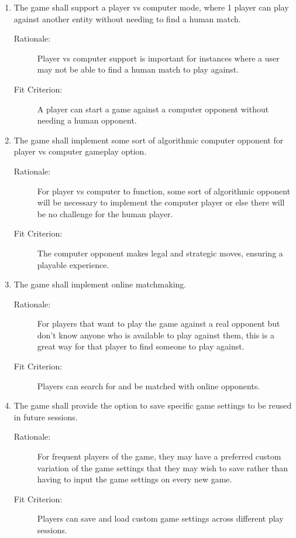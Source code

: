 \begin{enumerate}[label=R\arabic*, start=1, left=0pt]
    \item \label{R12} The game shall support a player vs computer mode, where 1 player can play against another entity without needing to find a human match.
    \begin{description}
        \item[Rationale:] Player vs computer support is important for instances where a user may not be able to find a human match to play against.
        \item[Fit Criterion:] A player can start a game against a computer opponent without needing a human opponent.
    \end{description}

    \item \label{R13} The game shall implement some sort of algorithmic computer opponent for  player vs computer gameplay option.
    \begin{description}
        \item[Rationale:] For player vs computer to function, some sort of algorithmic opponent will be necessary to implement the computer player or else there will be no challenge for the human player.
        \item[Fit Criterion:] The computer opponent makes legal and strategic moves, ensuring a playable experience.
    \end{description}

    \item \label{R14} The game shall implement online matchmaking.
    \begin{description}
        \item[Rationale:] For players that want to play the game against a real opponent but don't know anyone who is available to play against them, this is a great way for that player to find someone to play against.
        \item[Fit Criterion:] Players can search for and be matched with online opponents.
    \end{description}

    \item \label{R15} The game shall provide the option to save specific game settings to be reused in future sessions.
    \begin{description}
        \item[Rationale:] For frequent players of the game, they may have a preferred custom variation of the game settings that they may wish to save rather than having to input the game settings on every new game.
        \item[Fit Criterion:] Players can save and load custom game settings across different play sessions.
    \end{description}


\end{enumerate}
